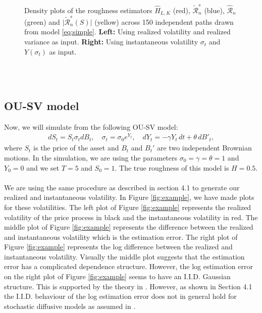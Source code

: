 \documentclass{article}
\begin{document}
\begin{figure}[htbp]
    \caption{Density plots of the roughness estimators $\widehat{H}_{L,K}$ (red), $\widetilde{\mathscr{R}}_n^s$ (blue), $\widehat{\mathscr{R}}_n$ (green) and $\lvert \widetilde{\mathscr{R}}_n^s (S)\rvert$ (yellow) across 150 independent paths drawn from model \eqref{eq:simple}. \textbf{Left:} Using realized volatility and realized variance as input. \textbf{Right:} Using instantaneous volatility $\sigma_t$ and $Y(\sigma_t)$ as input.}
    \label{fig:ex5dens}
\end{figure}\\\\
\subsection{OU-SV model}
Now, we will simulate from the following OU-SV model:
\begin{align}
dS_t = S_t \sigma_t dB_t, \quad \sigma_t = \sigma_0 e^{Y_t}, \quad dY_t = -\gamma Y_t \, dt + \theta \, dB'_t, \label{eq:ousv}
\end{align}
where $S_t$ is the price of the asset and $B_t$ and $B_t'$ are two independent Brownian motions. In the simulation, we are using the parameters $\sigma_0=\gamma=\theta=1$ and $Y_0=0$ and we set $T=5$ and $S_0=1$. The true roughness of this model is $H=0.5$.\\\\
We are using the same procedure as described in section 4.1 to generate our realized and instantaneous volatility. In Figure \ref{fig:example}, we have made plots for these volatilities. The left plot of Figure \ref{fig:example} represents the realized volatility of the price process in black and the instantaneous volatility in red. The middle plot of Figure \ref{fig:example} represents the difference between the realized and instantaneous volatility which is the estimation error. The right plot of Figure \ref{fig:example} represents the log difference between the realized and instantaneous volatility. Visually the middle plot suggests that the estimation error has a complicated dependence structure. However, the log estimation error on the right plot of Figure \ref{fig:example} seems to have an I.I.D. Gaussian structure. This is supported by the theory in \cite{fukasawa}. However, as shown in Section 4.1 the I.I.D. behaviour of the log estimation error does not in general hold for stochastic diffusive models as assumed in \cite{fukasawa}. 
\end{document}
